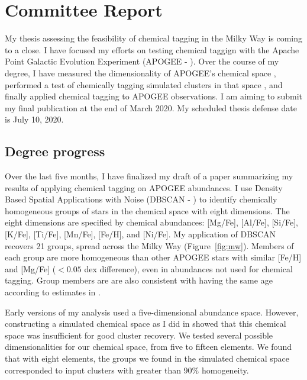 \documentclass[11pt]{article}
\begin{document}
    
    \section*{Committee Report}


	My thesis assessing the feasibility of chemical tagging in the Milky Way is coming to a close. I have focused my efforts on testing chemical taggign with the Apache Point Galactic Evolution Experiment (APOGEE - \citealt{Majewski2017}). Over the course of my degree, I have measured the dimensionality of APOGEE's chemical space \citep{Price-Jones2018}, performed a test of chemically tagging simulated clusters in that space \citep{Price-Jones2019}, and finally applied chemical tagging to APOGEE observations. I am aiming to submit my final publication at the end of March 2020. My scheduled thesis defense date is July 10, 2020.

    \subsection*{Degree progress}
  
    Over the last five months, I have finalized my draft of a paper summarizing my results of applying chemical tagging on APOGEE abundances. I use Density Based Spatial Applications with Noise (DBSCAN - \citealt{Ester1996}) to identify chemically homogeneous groups of stars in the chemical space with eight dimensions. The eight dimensions are specified by chemical abundances: [Mg/Fe], [Al/Fe], [Si/Fe], [K/Fe], [Ti/Fe], [Mn/Fe], [Fe/H], and [Ni/Fe]. My application of DBSCAN recovers 21 groups, spread across the Milky Way (Figure~\ref{fig:mw}). Members of each group are more homogeneous than other APOGEE stars with similar [Fe/H] and [Mg/Fe] ($< 0.05$ dex difference), even in abundances not used for chemical tagging. Group members are are also consistent with having the same age according to estimates in \citet{Mackereth2019}. 
    
    Early versions of my analysis used a five-dimensional abundance space. However, constructing a simulated chemical space as I did in \citet{Price-Jones2019} showed that this chemical space was insufficient for good cluster recovery. We tested several possible dimensionalities for our chemical space, from five to fifteen elements. We found that with eight elements, the groups we found in the simulated chemical space corresponded to input clusters with greater than 90\% homogeneity. 
    
\end{document}
